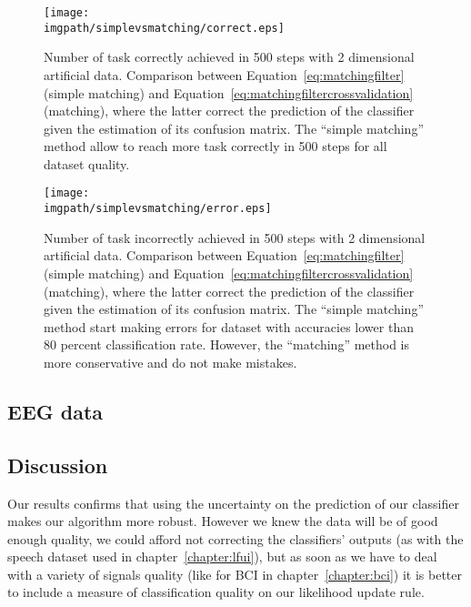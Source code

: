\begin{figure}[!ht]
\centering
\texttt{[image: \\imgpath/simplevsmatching/correct.eps]}
\caption{Number of task correctly achieved in 500 steps with 2 dimensional artificial data. Comparison between Equation~\ref{eq:matchingfilter} (simple matching) and Equation~\ref{eq:matchingfiltercrossvalidation} (matching), where the latter correct the prediction of the classifier given the estimation of its confusion matrix. The ``simple matching'' method allow to reach more task correctly in 500 steps for all dataset quality.
}
\label{fig:nCorrect_simplevsmatching}
\end{figure} 

\begin{figure}[!ht]
\centering
\texttt{[image: \\imgpath/simplevsmatching/error.eps]}
\caption{Number of task incorrectly achieved in 500 steps with 2 dimensional artificial data. Comparison between Equation~\ref{eq:matchingfilter} (simple matching) and Equation~\ref{eq:matchingfiltercrossvalidation} (matching), where the latter correct the prediction of the classifier given the estimation of its confusion matrix. The ``simple matching'' method start making errors for dataset with accuracies lower than 80 percent classification rate. However, the ``matching'' method is more conservative and do not make mistakes.}
\label{fig:nWrongEEG_simplevsmatching}
\end{figure} 



\subsection{EEG data}


\subsection{Discussion}

Our results confirms that using the uncertainty on the prediction of our classifier makes our algorithm more robust. However we knew the data will be of good enough quality, we could afford not correcting the classifiers' outputs (as with the speech dataset used in chapter~\ref{chapter:lfui}), but as soon as we have to deal with a variety of signals quality (like for BCI in chapter~\ref{chapter:bci}) it is better to include a measure of classification quality on our likelihood update rule.